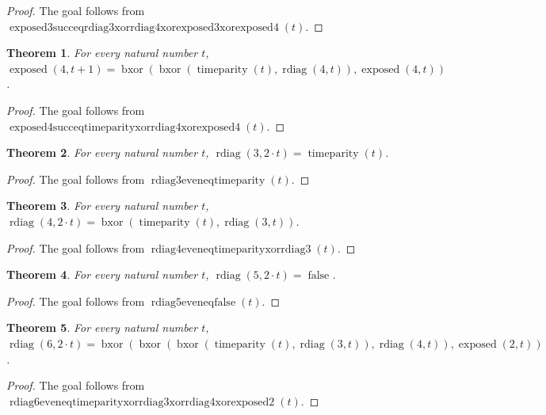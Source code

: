 \documentclass[11pt]{article}
\newtheorem{theorem}{Theorem}[section]
\theoremstyle{definition}
\begin{document}
\begin{proof}
The goal follows from \(\operatorname{exposed3succeqrdiag3xorrdiag4xorexposed3xorexposed4}(t)\).
\end{proof}
\begin{theorem}
\label{ll:observations:exposed4-succ-eq-time-parity-xor-rdiag4-xor-exposed4}
For every natural number \(t\), \(\operatorname{exposed}(4, t + 1) = \operatorname{bxor}(\operatorname{bxor}(\operatorname{timeparity}(t), \operatorname{rdiag}(4, t)), \operatorname{exposed}(4, t))\).
\end{theorem}
\begin{proof}
The goal follows from \(\operatorname{exposed4succeqtimeparityxorrdiag4xorexposed4}(t)\).
\end{proof}
\begin{theorem}
\label{ll:observations:rdiag3-even-eq-time-parity}
For every natural number \(t\), \(\operatorname{rdiag}(3, 2 \cdot t) = \operatorname{timeparity}(t)\).
\end{theorem}
\begin{proof}
The goal follows from \(\operatorname{rdiag3eveneqtimeparity}(t)\).
\end{proof}
\begin{theorem}
\label{ll:observations:rdiag4-even-eq-time-parity-xor-rdiag3}
For every natural number \(t\), \(\operatorname{rdiag}(4, 2 \cdot t) = \operatorname{bxor}(\operatorname{timeparity}(t), \operatorname{rdiag}(3, t))\).
\end{theorem}
\begin{proof}
The goal follows from \(\operatorname{rdiag4eveneqtimeparityxorrdiag3}(t)\).
\end{proof}
\begin{theorem}
\label{ll:observations:rdiag5-even-eq-false}
For every natural number \(t\), \(\operatorname{rdiag}(5, 2 \cdot t) = \operatorname{false}\).
\end{theorem}
\begin{proof}
The goal follows from \(\operatorname{rdiag5eveneqfalse}(t)\).
\end{proof}
\begin{theorem}
\label{ll:observations:rdiag6-even-eq-time-parity-xor-rdiag3-xor-rdiag4-xor-exposed2}
For every natural number \(t\), \(\operatorname{rdiag}(6, 2 \cdot t) = \operatorname{bxor}(\operatorname{bxor}(\operatorname{bxor}(\operatorname{timeparity}(t), \operatorname{rdiag}(3, t)), \operatorname{rdiag}(4, t)), \operatorname{exposed}(2, t))\).
\end{theorem}
\begin{proof}
The goal follows from \(\operatorname{rdiag6eveneqtimeparityxorrdiag3xorrdiag4xorexposed2}(t)\).
\end{proof}
\end{document}
